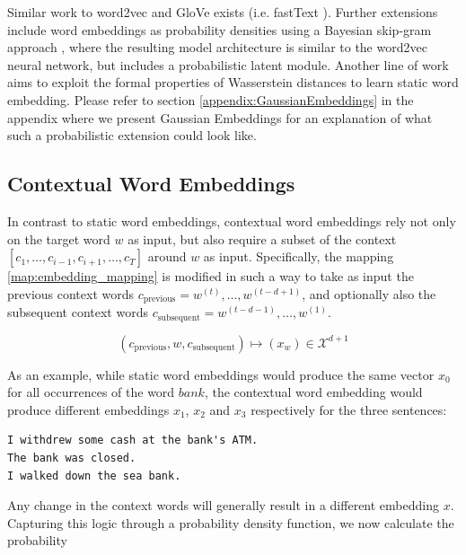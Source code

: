 \documentclass[a4paper,12pt,oneside,openright]{report}
\begin{document}
Similar work to word2vec and GloVe exists (i.e. fastText \cite{bojanowski17}).
Further extensions include word embeddings as probability densities using a Bayesian skip-gram approach \cite{brazinskas19}, where the resulting model architecture is similar to the word2vec neural network, but includes a probabilistic latent module.
Another line of work \cite{yan19} aims to exploit the formal properties of Wasserstein distances to learn static word embedding.
Please refer to section \ref{appendix:GaussianEmbeddings} in the appendix where we present Gaussian Embeddings \cite{vilnis14} for an explanation of what such a probabilistic extension could look like.

\subsection{Contextual Word Embeddings}

In contrast to static word embeddings, contextual word embeddings rely not only on the target word $w$ as input, but also require a subset of the context $[c_1, \ldots, c_{i-1}, c_{i+1}, \ldots, c_T]$ around $w$ as input.
Specifically, the mapping \eqref{map:embedding_mapping} is modified in such a way to take as input the previous context words $c_\text{previous} = w^{(t)}, \ldots, w^{(t-d + 1)}$, and optionally also the subsequent context words $c_\text{subsequent} = w^{(t-d - 1)}, \ldots, w^{(1)}$.

\begin{equation}
(c_\text{previous}, w, c_\text{subsequent}) \mapsto (x_w) \in \mathcal{X}^{d + 1}
\end{equation}{\label{map:context_embedding_mapping}}

As an example, while static word embeddings would produce the same vector $x_0$ for all occurrences of the word $bank$, the contextual word embedding would produce different embeddings $x_1$, $x_2$ and $x_3$ respectively for the three sentences:

\begin{tcolorbox}
\begin{verbatim}
I withdrew some cash at the bank's ATM.
The bank was closed.
I walked down the sea bank.
\end{verbatim}
\end{tcolorbox}

Any change in the context words will generally result in a different embedding $x$.
Capturing this logic through a probability density function, we now calculate the probability
\end{document}
